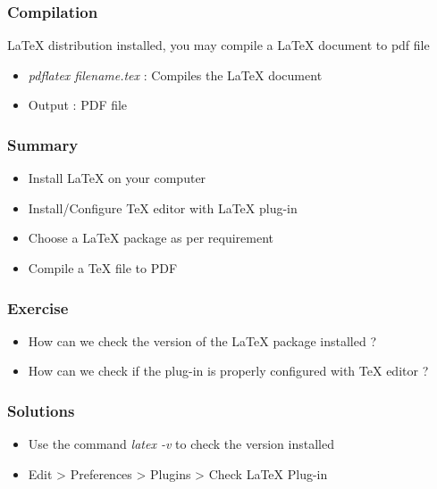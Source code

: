 \documentclass[17pt,compress]{beamer}
\begin{document}
\begin{frame}[fragile]
  \frametitle{Compilation}
  LaTeX distribution installed, you may compile a LaTeX document to pdf file
  \begin{itemize}
  \item \emph{pdflatex filename.tex} : Compiles the LaTeX document
  \item Output : PDF file
  \end{itemize} 
\end{frame}


\begin{frame}[fragile]
	\frametitle{Summary}
	\begin{itemize}
        \item Install LaTeX on your computer
        \item Install/Configure TeX editor with LaTeX plug-in
        \item Choose a LaTeX package as per requirement
	\item Compile a TeX file to PDF
	\end{itemize}
\end{frame}

\begin{frame}[fragile]
	\frametitle{Exercise}
	\begin{itemize}
        \item How can we check the version of the LaTeX package installed ?
        \item How can we check if the plug-in is properly configured with TeX 
              editor ?
	\end{itemize}
\end{frame}

\begin{frame}[fragile]
	\frametitle{Solutions}
	\begin{itemize}
        \item Use the command \textit {latex -v} to check the version installed
        \item Edit > Preferences > Plugins > Check LaTeX Plug-in
	\end{itemize}
\end{frame}
\end{document}
